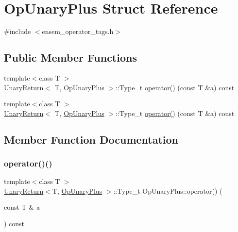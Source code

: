 \hypertarget{structOpUnaryPlus}{}\section{Op\+Unary\+Plus Struct Reference}
\label{structOpUnaryPlus}


{\ttfamily \#include $<$ensem\+\_\+operator\+\_\+tags.\+h$>$}

\subsection*{Public Member Functions}
\begin{DoxyCompactItemize}
\item 
{\footnotesize template$<$class T $>$ }\\\mbox{\hyperlink{structUnaryReturn}{Unary\+Return}}$<$ T, \mbox{\hyperlink{structOpUnaryPlus}{Op\+Unary\+Plus}} $>$\+::Type\+\_\+t \mbox{\hyperlink{structOpUnaryPlus_ad54a5d02fba52ca6cf35871d36aefab4}{operator()}} (const T \&a) const
\item 
{\footnotesize template$<$class T $>$ }\\\mbox{\hyperlink{structUnaryReturn}{Unary\+Return}}$<$ T, \mbox{\hyperlink{structOpUnaryPlus}{Op\+Unary\+Plus}} $>$\+::Type\+\_\+t \mbox{\hyperlink{structOpUnaryPlus_ad54a5d02fba52ca6cf35871d36aefab4}{operator()}} (const T \&a) const
\end{DoxyCompactItemize}


\subsection{Member Function Documentation}
\mbox{\label{structOpUnaryPlus_ad54a5d02fba52ca6cf35871d36aefab4}} 
\subsubsection{\texorpdfstring{operator()()}{operator()()}\hspace{0.1cm}{\footnotesize\ttfamily [1/2]}}
{\footnotesize\ttfamily template$<$class T $>$ \\
\mbox{\hyperlink{structUnaryReturn}{Unary\+Return}}$<$T, \mbox{\hyperlink{structOpUnaryPlus}{Op\+Unary\+Plus}} $>$\+::Type\+\_\+t Op\+Unary\+Plus\+::operator() (\begin{DoxyParamCaption}\item[{const T \&}]{a }\end{DoxyParamCaption}) const\hspace{0.3cm}{\ttfamily [inline]}}

